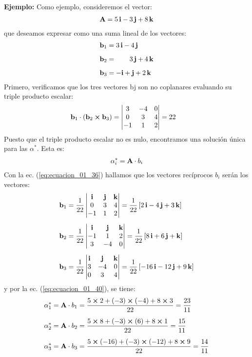 \noindent
\textbf{Ejemplo:} Como ejemplo, consideremos el vector:
\begin{align*}
    \vb{A} = 5 \, \vb{i} - 3 \, \vb{j} + 8 \, \vb{k}
\end{align*}
que deseamos expresar como una suma lineal de los vectores:
\begin{align*}
    \vb{b}_{1} &= 3 \, \vb{i} - 4 \, \vb{j} \\[0.5em]
    \vb{b}_{2} &= \quad \quad 3 \, \vb{j} + 4 \, \vb{k} \\[0.5em]
    \vb{b}_{3} &= - \vb{i} + \vb{j} + 2 \, \vb{k}
\end{align*}
Primero, verificamos que los tres vectores bj son no coplanares evaluando su triple producto escalar:
\begin{align*}
    \vb{b}_{1} \cdot \left( \vb{b}_{2} \cp \vb{b}_{3} \right) &= \mdet{
        3 & -4 & 0 \\
        0 & 3 & 4 \\
        -1 & 1 & 2
    } = 22
\end{align*}
Puesto que el triple producto escalar no es nulo, encontramos una solución única para las $\alpha^{*}$. Esta es:
\begin{align*}
    \alpha_{i}^{*} = \vb{A} \cdot b_{i}
\end{align*}
Con la ec. (\ref{eq:ecuacion_01_36}) hallamos que los vectores recíprocos $b_{i}$ serán los vectores:
\begin{align*}
    \vb{b}_{1} &= \dfrac{1}{22} \mdet{
        \vb{i} & \vb{j} & \vb{k} \\
        0 & 3 & 4 \\
        -1 & 1 & 2
    } = \dfrac{1}{22} \left[ 2 \, \vb{i} - 4 \, \vb{j} + 3 \, \vb{k} \right] \\[0.5em]
    \vb{b}_{2} &= \dfrac{1}{22} \mdet{
        \vb{i} & \vb{j} & \vb{k} \\
        -1 & 1 & 2 \\
        3 & -4 & 0
    } = \dfrac{1}{22} \left[ 8 \, \vb{i} + 6 \, \vb{j} + \vb{k} \right] \\[0.5em]
    \vb{b}_{3} &= \dfrac{1}{22} \mdet{
        \vb{i} & \vb{j} & \vb{k} \\
        3 & -4 & 0 \\
        0 & 3 & 4
    } = \dfrac{1}{22} \left[ -16 \, \vb{i} - 12 \, \vb{j} + 9 \, \vb{k} \right]
\end{align*}
y por la ec. (\ref{eq:ecuacion_01_40}), se tiene:
\begin{align*}
    \alpha_{1}^{*} &= \vb{A} \cdot b_{1} = \dfrac{5 \cp 2 + \left( -3 \right) \cp \left( -4 \right) + 8 \cp 3}{22} = \dfrac{23}{11} \\[0.5em]
    \alpha_{2}^{*} &= \vb{A} \cdot b_{2} = \dfrac{5 \cp 8 + \left( -3 \right) \cp \left( 6 \right) + 8 \cp 1}{22} = \dfrac{15}{11} \\[0.5em]
    \alpha_{3}^{*} &= \vb{A} \cdot b_{3} = \dfrac{5 \cp \left( -16 \right) + \left( - 3 \right) \cp \left( -12 \right) + 8 \cp 9}{22} = \dfrac{14}{11}
\end{align*}
